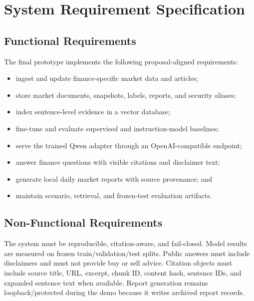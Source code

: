 \documentclass[12pt,a4paper]{report}
\begin{document}
\chapter{System Requirement Specification}

\section{Functional Requirements}
The final prototype implements the following proposal-aligned requirements:
\begin{itemize}[leftmargin=1.6em]
    \item ingest and update finance-specific market data and articles;
    \item store market documents, snapshots, labels, reports, and security aliases;
    \item index sentence-level evidence in a vector database;
    \item fine-tune and evaluate supervised and instruction-model baselines;
    \item serve the trained Qwen adapter through an OpenAI-compatible endpoint;
    \item answer finance questions with visible citations and disclaimer text;
    \item generate local daily market reports with source provenance; and
    \item maintain scenario, retrieval, and frozen-test evaluation artifacts.
\end{itemize}

\section{Non-Functional Requirements}
The system must be reproducible, citation-aware, and fail-closed. Model results are measured on frozen train/validation/test splits. Public answers must include disclaimers and must not provide buy or sell advice. Citation objects must include source title, URL, excerpt, chunk ID, content hash, sentence IDs, and expanded sentence text when available. Report generation remains loopback/protected during the demo because it writes archived report records.
\end{document}
